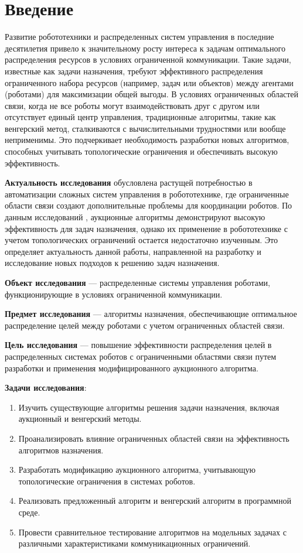 \chapter*{Введение}

Развитие робототехники и распределенных систем управления в последние десятилетия привело к значительному росту интереса к задачам оптимального распределения ресурсов в условиях ограниченной коммуникации. Такие задачи, известные как задачи назначения, требуют эффективного распределения ограниченного набора ресурсов (например, задач или объектов) между агентами (роботами) для максимизации общей выгоды. В условиях ограниченных областей связи, когда не все роботы могут взаимодействовать друг с другом или отсутствует единый центр управления, традиционные алгоритмы, такие как венгерский метод, сталкиваются с вычислительными трудностями или вообще неприменимы. Это подчеркивает необходимость разработки новых алгоритмов, способных учитывать топологические ограничения и обеспечивать высокую эффективность.

\textbf{Актуальность исследования} обусловлена растущей потребностью в автоматизации сложных систем управления в робототехнике, где ограниченные области связи создают дополнительные проблемы для координации роботов. По данным исследований \cite{bertsekas1990}, аукционные алгоритмы демонстрируют высокую эффективность для задач назначения, однако их применение в робототехнике с учетом топологических ограничений остается недостаточно изученным. Это определяет актуальность данной работы, направленной на разработку и исследование новых подходов к решению задач назначения.

\textbf{Объект исследования} --- распределенные системы управления роботами, функционирующие в условиях ограниченной коммуникации.

\textbf{Предмет исследования} --- алгоритмы назначения, обеспечивающие оптимальное распределение целей между роботами с учетом ограниченных областей связи.

\textbf{Цель исследования} --- повышение эффективности распределения целей в распределенных системах роботов с ограниченными областями связи путем разработки и применения модифицированного аукционного алгоритма.

\textbf{Задачи исследования}:
\begin{enumerate}
    \item Изучить существующие алгоритмы решения задачи назначения, включая аукционный и венгерский методы.
    \item Проанализировать влияние ограниченных областей связи на эффективность алгоритмов назначения.
    \item Разработать модификацию аукционного алгоритма, учитывающую топологические ограничения в системах роботов.
    \item Реализовать предложенный алгоритм и венгерский алгоритм в программной среде.
    \item Провести сравнительное тестирование алгоритмов на модельных задачах с различными характеристиками коммуникационных ограничений.
\end{enumerate}

